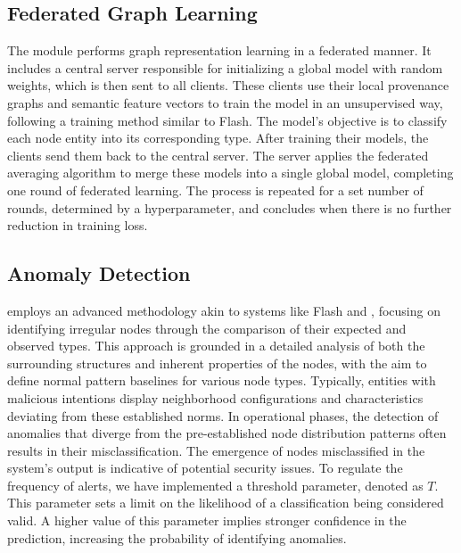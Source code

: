 \subsection{Federated Graph Learning}
The module performs graph representation learning in a federated manner. It includes a central server responsible for initializing a global \gnnshort model with random weights, which is then sent to all clients. These clients use their local provenance graphs and semantic feature vectors to train the \gnnshort model in an unsupervised way, following a training method similar to Flash. The \gnnshort model's objective is to classify each node entity into its corresponding type. After training their models, the clients send them back to the central server. The server applies the federated averaging algorithm to merge these models into a single global model, completing one round of federated learning. The process is repeated for a set number of rounds, determined by a hyperparameter, and concludes when there is no further reduction in training loss.

\subsection{Anomaly Detection}
\Sys employs an advanced methodology akin to systems like Flash and \threatrace, focusing on identifying irregular nodes through the comparison of their expected and observed types. This approach is grounded in a detailed analysis of both the surrounding structures and inherent properties of the nodes, with the aim to define normal pattern baselines for various node types. Typically, entities with malicious intentions display neighborhood configurations and characteristics deviating from these established norms. In operational phases, the detection of anomalies that diverge from the pre-established node distribution patterns often results in their misclassification. The emergence of nodes misclassified in the system's output is indicative of potential security issues. To regulate the frequency of alerts, we have implemented a threshold parameter, denoted as $T$. This parameter sets a limit on the likelihood of a classification being considered valid. A higher value of this parameter implies stronger confidence in the prediction, increasing the probability of identifying anomalies.

